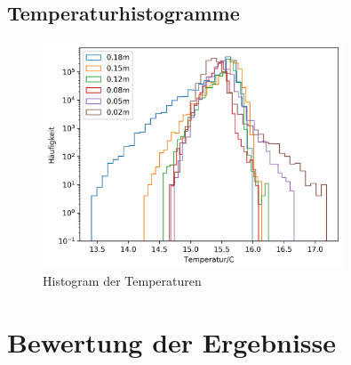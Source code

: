 \documentclass[12pt,a4paper,titlepage,headinclude]{scrartcl}
\numberwithin{equation}{subsection}
\begin{document}
\subsection{Temperaturhistogramme}

\begin{figure}[!ht]
\centering
\includegraphics[width=0.8\textwidth]{hist.png}
\caption{Histogram der Temperaturen}
\label{fig:hist}
\end{figure}


\newpage
\section{Bewertung der Ergebnisse}
\label{sec:diskussion}

\newpage
\end{document}
